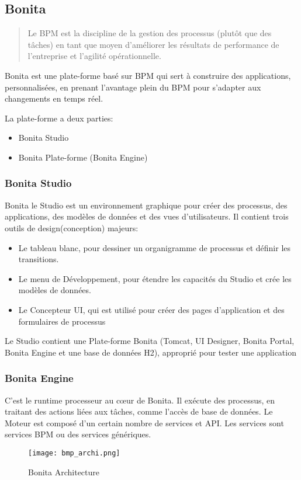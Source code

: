 \subsection{Bonita}
\begin{quotation}
Le BPM est la discipline de la gestion des processus (plutôt que des tâches) en tant que moyen d'améliorer les résultats de performance de l'entreprise et l'agilité opérationnelle. \cite{gartnerdic}
\end{quotation}

Bonita est une plate-forme basé sur BPM qui sert à construire des applications, personnalisées, en prenant l'avantage plein du BPM pour s'adapter aux changements en temps réel.

La plate-forme a deux parties:
\begin{itemize}
  \item Bonita Studio
  \item Bonita Plate-forme (Bonita Engine)
\end{itemize}

\subsubsection{Bonita Studio}
Bonita le Studio est un environnement graphique pour créer des processus, des applications, des modèles de données et des vues d'utilisateurs. Il contient trois outils de design(conception) majeurs:

\begin{itemize}
  \item Le tableau blanc, pour dessiner un organigramme de processus et définir les transitions.
  \item Le menu de Développement, pour étendre les capacités du Studio et crée les modèles de données.
  \item Le Concepteur UI, qui est utilisé pour créer des pages d'application et des formulaires de processus
\end{itemize}

Le Studio contient une Plate-forme Bonita (Tomcat, UI Designer, Bonita Portal, Bonita Engine et une base de données H2), approprié pour tester une application

\subsubsection{Bonita Engine}
C'est le runtime processeur au cœur de Bonita. Il exécute des processus, en traitant des actions liées aux tâches, comme l'accès de base de données. Le Moteur est composé d'un certain nombre de services et API. Les services sont services BPM ou des services génériques.

\begin{figure}[!ht]
\texttt{[image: bmp\_archi.png]}
\caption{Bonita Architecture}
\end{figure}
